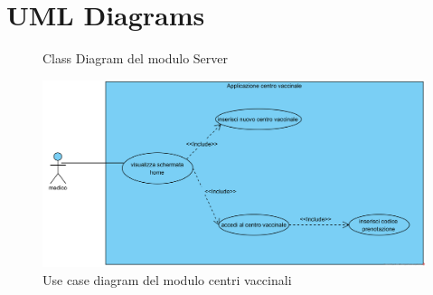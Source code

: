 \section{UML Diagrams}

\begin{figure}[p]
	\caption{Class Diagram del modulo Server}
	\label{fig:classDiagramServer}
\end{figure}

\begin{figure}[t]
	\includegraphics[width=\textwidth]{./img/UseCaseCentriVaccinali}
	\caption{Use case diagram del modulo centri vaccinali}
\end{figure}

